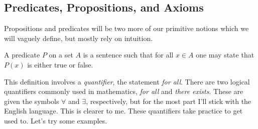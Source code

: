         \subsection{Predicates, Propositions, and Axioms}
            Propositions and predicates will be two more of our primitive
            notions which we will vaguely define, but mostly rely on intuition.
            \begin{definition}
                \label{def:Predicate}%
                A \gls{predicate} $P$ on a \gls{set} $A$ is a sentence such
                that for all $x\in{A}$ one may state that $P(x)$ is either
                true or false.
            \end{definition}
            This definition involves a \textit{quantifier}, the statement
            \textit{for all}. There are two logical quantifiers commonly used
            in mathematics, \textit{for all} and \textit{there exists}. These
            are given the symbols $\forall$ and $\exists$, respectively, but
            for the most part I'll stick with the English language. This is
            clearer to me. These quantifiers take practice to get used to. Let's
            try some examples.
